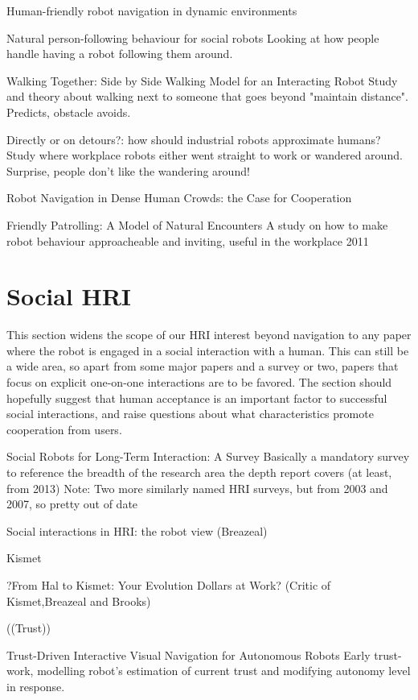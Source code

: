\documentclass{sfuthesis}
\begin{document}
 Human-friendly robot navigation in dynamic environments 



Natural person-following behaviour for social robots	Looking at how people handle having a robot following them around.	

Walking Together: Side by Side Walking Model for an Interacting Robot	Study and theory about walking next to someone that goes beyond "maintain distance". Predicts, obstacle avoids.

Directly or on detours?: how should industrial robots approximate humans?	Study where workplace robots either went straight to work or wandered around. Surprise, people don't like the wandering around!	

Robot Navigation in Dense Human Crowds: the Case for Cooperation

Friendly Patrolling: A Model of Natural Encounters	A study on how to make robot behaviour approacheable and inviting, useful in the workplace	2011




\section{Social HRI}

This section widens the scope of our HRI interest beyond navigation to any paper where the robot is engaged in a social interaction with a human. This can still be a wide area, so apart from some major papers and a survey or two, papers that focus on explicit one-on-one interactions are to be favored. The section should hopefully suggest that human acceptance is an important factor to successful social interactions, and raise questions about what characteristics promote cooperation from users.

Social Robots for Long-Term Interaction: A Survey Basically a mandatory survey to reference the breadth of the research area the depth report covers (at least, from 2013) Note: Two more similarly named HRI surveys, but from 2003 and 2007, so pretty out of date

Social interactions in HRI: the robot view (Breazeal)

Kismet

?From Hal to Kismet: Your Evolution Dollars at Work? (Critic of Kismet,Breazeal and Brooks)

((Trust))

Trust-Driven Interactive Visual Navigation for Autonomous Robots	Early trust-work, modelling robot's estimation of current trust and modifying autonomy level in response.
\end{document}

